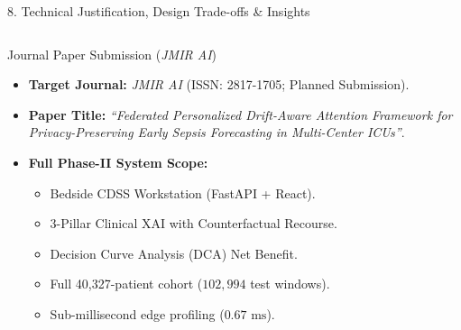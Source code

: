 \documentclass[aspectratio=169, 11pt]{beamer}
\begin{document}
\begin{frame}{8. Technical Justification, Design Trade-offs \& Insights}
\begin{columns}[T]
        \begin{block}{Journal Paper Submission (\textit{JMIR AI})}
            \scriptsize
            \begin{itemize}
                \item \textbf{Target Journal:} \textit{JMIR AI} (ISSN: 2817-1705; Planned Submission).
                \item \textbf{Paper Title:} \textit{``Federated Personalized Drift-Aware Attention Framework for Privacy-Preserving Early Sepsis Forecasting in Multi-Center ICUs''}.
                \item \textbf{Full Phase-II System Scope:}
                \begin{itemize}
                    \scriptsize
                    \item Bedside CDSS Workstation (FastAPI + React).
                    \item 3-Pillar Clinical XAI with Counterfactual Recourse.
                    \item Decision Curve Analysis (DCA) Net Benefit.
                    \item Full 40,327-patient cohort ($102,994$ test windows).
                    \item Sub-millisecond edge profiling ($0.67\text{ ms}$).
                \end{itemize}
            \end{itemize}
        \end{block}
    \end{columns}
\end{frame}
\end{document}
